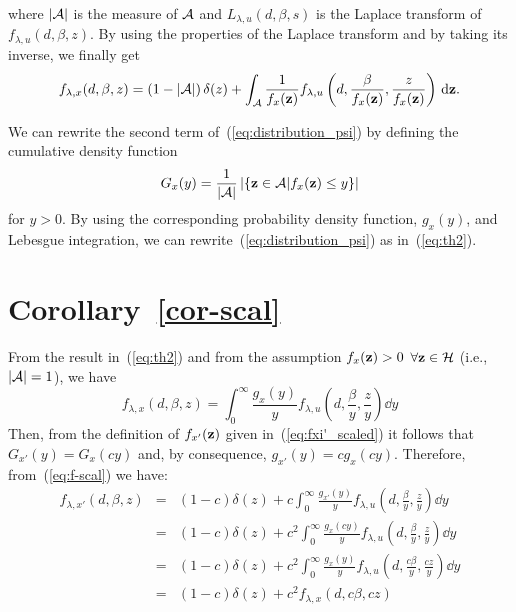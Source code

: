 \documentclass[11pt, draftcls, onecolumn, a4paper]{IEEEtran}
\newcommand{\zv}{{\bf z}}
\newcommand{\Ac}{{\cal A}}
\newcommand{\Hc}{{\cal H}}
\def\non{\nonumber\\}
\begin{document}
where $|\Ac|$ is the measure of $\Ac$ and $L_{\lambda,u}(d,\beta,s)$
is the Laplace transform of $f_{\lambda,u}(d,\beta,z)$. By using the
properties of the Laplace transform and by taking its inverse, we
finally get
\begin{eqnarray} 
f_{\lambda,x}(d,\beta,z) = \left(1-|\Ac|\right)\delta(z)+\int_{\Ac}\frac{1}{f_x(\zv)}
f_{\lambda,u}\left(d,\frac{\beta}{f_x(\zv)},\frac{z}{f_x(\zv)}\right)\dd \zv  .
\label{eq:distribution_psi}
\end{eqnarray}

We can rewrite the second term of~(\ref{eq:distribution_psi}) by
defining the cumulative density function 
\[ G_x(y) = \frac{1}{|\Ac|}\left|\left\{\zv \in \Ac | f_x(\zv)\le y \right\}\right| \] 
for $y >0$. By using the corresponding probability
  density function, $g_x(y)$, and Lebesgue integration, we can
 rewrite~(\ref{eq:distribution_psi}) as in~(\ref{eq:th2}).


\section{Corollary~\ref{cor-scal}}
\label{app:cor-scal}
From the result in~(\ref{eq:th2}) and from the assumption
$f_{x}(\zv)>0$ $\forall\zv \in \Hc$ (i.e., $|\Ac|=1$), we have
\[ f_{\lambda,x}(d,\beta,z) =  \int_0^{\infty}\frac{g_x(y)}{y}f_{\lambda,u}\left(d,\frac{\beta}{y},\frac{z}{y}\right)\dd y \]
Then, from the definition of $f_{x'}(\zv)$ given
in~(\ref{eq:fxi'_scaled}) it follows that $G_{x'}(y) = G_x(cy)$
and, by consequence, $g_{x'}(y) = c g_x(cy)$. Therefore,
from~(\ref{eq:f-scal}) we have:
\begin{eqnarray}
f_{\lambda,x'}(d,\beta,z) 
&=& (1-c)\delta(z)+ c\int_0^{\infty}\frac{g_{x'}(y)}{y}f_{\lambda,u}\left(d,\frac{\beta}{y},\frac{z}{y}\right)\dd y \non
&=& (1-c)\delta(z)+ c^2\int_0^{\infty}\frac{g_{x}(cy)}{y}f_{\lambda,u}\left(d,\frac{\beta}{y},\frac{z}{y}\right)\dd y \non
&=& (1-c)\delta(z)+ c^2\int_0^{\infty}\frac{g_{x}(y)}{y}f_{\lambda,u}\left(d,\frac{c\beta}{y},\frac{cz}{y}\right)\dd y \non
&=& (1-c)\delta(z)+ c^2 f_{\lambda,x}(d,c\beta,cz)\nonumber
\end{eqnarray}
\end{document}
